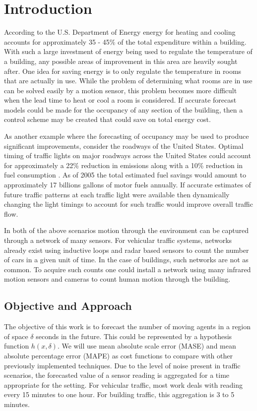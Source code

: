 \chapter{Introduction}
According to the U.S. Department of Energy \cite{DOE2010} energy for heating and cooling accounts for approximately 35 - 45\% of the total expenditure within a building.  With such a large investment of energy being used to regulate the temperature of a building, any possible areas of improvement in this area are heavily sought after.  One idea for saving energy is to only regulate the temperature in rooms that are actually in use.  While the problem of determining what rooms are in use can be solved easily by a motion sensor, this problem becomes more difficult when the lead time to heat or cool a room is considered.  If accurate forecast models could be made for the occupancy of any section of the building, then a control scheme may be created that could save on total energy cost.

As another example where the forecasting of occupancy may be used to produce significant improvements, consider the roadways of the United States.  Optimal timing of traffic lights on major roadways across the United States could account for approximately a 22\% reduction in emissions along with a 10\% reduction in fuel consumption \cite{DOT2007}.  As of 2005 the total estimated fuel savings would amount to approximately 17 billions gallons of motor fuels annually.  If accurate estimates of future traffic patterns at each traffic light were available then dynamically changing the light timings to account for such traffic would improve overall traffic flow.

In both of the above scenarios motion through the environment can be captured through a network of many sensors.  For vehicular traffic systems, networks already exist using inductive loops and radar based sensors to count the number of cars in a given unit of time.  In the case of buildings, such networks are not as common.  To acquire such counts one could install a network using many infrared motion sensors and cameras to count human motion through the building.  

\section{Objective and Approach}
The objective of this work is to forecast the number of moving agents in a region of space $\delta$ seconds in the future.  This could be represented by a hypothesis function $h(x, \delta)$.  We will use mean absolute scale error (MASE) \cite{Hyndman2006} and mean absolute percentage error (MAPE) as  cost functions to compare with other previously implemented techniques.  Due to the level of noise present in traffic scenarios, the forecasted value of a sensor reading is aggregated for a time appropriate for the setting.  For vehicular traffic, most work deals with reading every 15 minutes to one hour.  For building traffic, this aggregation is 3 to 5 minutes.  

